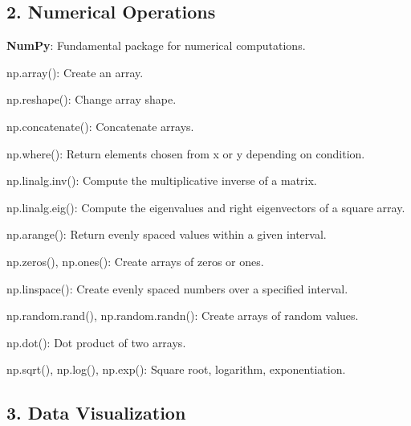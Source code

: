 \subsection*{2. Numerical Operations}


\begin{DoxyItemize}
\item {\bfseries Num\+Py}\+: Fundamental package for numerical computations.
\begin{DoxyItemize}
\item {\ttfamily np.\+array()}\+: Create an array.
\item {\ttfamily np.\+reshape()}\+: Change array shape.
\item {\ttfamily np.\+concatenate()}\+: Concatenate arrays.
\item {\ttfamily np.\+where()}\+: Return elements chosen from x or y depending on condition.
\item {\ttfamily np.\+linalg.\+inv()}\+: Compute the multiplicative inverse of a matrix.
\item {\ttfamily np.\+linalg.\+eig()}\+: Compute the eigenvalues and right eigenvectors of a square array.
\item {\ttfamily np.\+arange()}\+: Return evenly spaced values within a given interval.
\item {\ttfamily np.\+zeros()}, {\ttfamily np.\+ones()}\+: Create arrays of zeros or ones.
\item {\ttfamily np.\+linspace()}\+: Create evenly spaced numbers over a specified interval.
\item {\ttfamily np.\+random.\+rand()}, {\ttfamily np.\+random.\+randn()}\+: Create arrays of random values.
\item {\ttfamily np.\+dot()}\+: Dot product of two arrays.
\item {\ttfamily np.\+sqrt()}, {\ttfamily np.\+log()}, {\ttfamily np.\+exp()}\+: Square root, logarithm, exponentiation.
\end{DoxyItemize}
\end{DoxyItemize}

\subsection*{3. Data Visualization}


